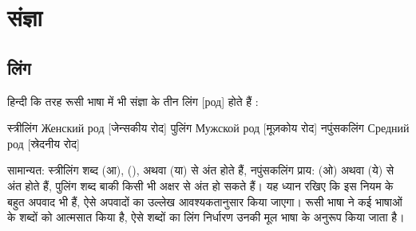\chapter{संज्ञा}\label{ch: noun}

\section{लिंग}\label{sec:noun-gender}
हिन्दी कि तरह रूसी भाषा में भी संज्ञा के तीन लिंग [род]  होते हैं :

स्त्रीलिंग  Женский род [जेन्सकीय रोद]
पुलिंग Мужской род [मूज़कोय रोद]
नपुंसकलिंग Средний род [स्रेदनीय रोद]

सामान्यत: स्त्रीलिंग शब्द  (आ),  (),  अथवा  (या)  से अंत होते हैं, नपुंसकलिंग  प्राय:  (ओ) अथवा 
 (ये) से अंत होते हैं, पुलिंग शब्द बाकी किसी भी अक्षर से अंत हो सकते हैं। यह ध्यान रखिए कि इस नियम के बहुत अपवाद भी हैं, ऐसे अपवादों का उल्लेख 
आवश्यकतानुसार किया जाएगा। रूसी भाषा ने कई भाषाओं के शब्दों को आत्मसात किया है, ऐसे शब्दों का लिंग निर्धारण उनकी मूल भाषा के अनुरूप किया जाता है।

